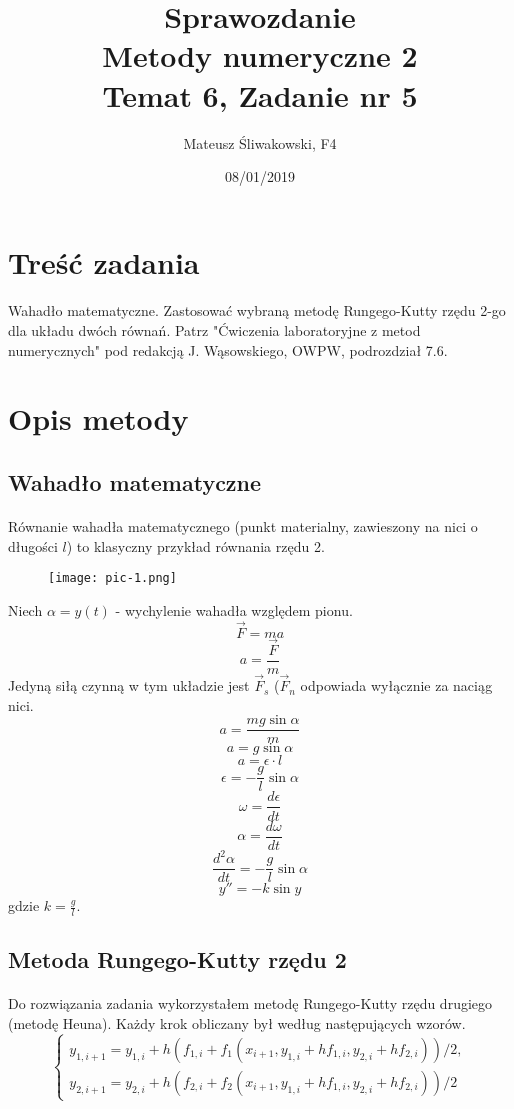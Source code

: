 \documentclass{article}
\title{Sprawozdanie \\Metody numeryczne 2 \\\textbf{Temat 6, Zadanie nr 5}}
\date{08/01/2019}
\author{Mateusz Śliwakowski, F4}
\begin{document}
  \maketitle
 	  \newpage

\section{Treść zadania}
\paragraph{}
Wahadło matematyczne. Zastosować wybraną metodę Rungego-Kutty rzędu 2-go dla układu dwóch równań. Patrz "Ćwiczenia laboratoryjne z metod numerycznych" pod redakcją J. Wąsowskiego, OWPW, podrozdział 7.6.
\section{Opis metody}
\subsection{Wahadło matematyczne}
\paragraph{}
Równanie wahadła matematycznego (punkt materialny, zawieszony na nici o długości $l$) to klasyczny przykład równania rzędu 2.
\begin{figure}[H]
  \texttt{[image: pic-1.png]}
\end{figure}
Niech $\alpha = y(t)$ - wychylenie wahadła względem pionu.
$$\vec{F} = ma$$
$$a = \frac{\vec{F}}{m}$$
Jedyną siłą czynną w tym układzie jest $\vec{F}_s$ ($\vec{F}_n$ odpowiada wyłącznie za naciąg nici.
$$a = \frac{mg \sin{\alpha}}{m}$$
$$a = g\sin{\alpha}$$
$$a = \epsilon \cdot l$$
$$\epsilon = -\frac{g}{l}\sin{\alpha}$$
$$\omega = \frac{d\epsilon}{dt}$$
$$\alpha = \frac{d\omega}{dt}$$
$$\frac{d^2\alpha}{dt} = -\frac{g}{l}\sin{\alpha}$$
$$y''=-k\sin{y}$$
gdzie $k = \frac{g}{l}$.
\subsection{Metoda Rungego-Kutty rzędu 2}
\paragraph{}
Do rozwiązania zadania wykorzystałem metodę Rungego-Kutty rzędu drugiego (metodę Heuna). Każdy krok obliczany był według następujących wzorów.
$$
\left\{ \begin{array}{ll}
y_{1,i+1}=y_{1,i}+h(f_{1,i} + f_1(x_{i+1},y_{1,i}+hf_{1,i},y_{2,i} +hf_{2,i}))/2,\\
y_{2,i+1}=y_{2,i}+h(f_{2,i} + f_2(x_{i+1},y_{1,i}+hf_{1,i},y_{2,i} +hf_{2,i}))/2
\end{array} \right.
$$
\end{document}
